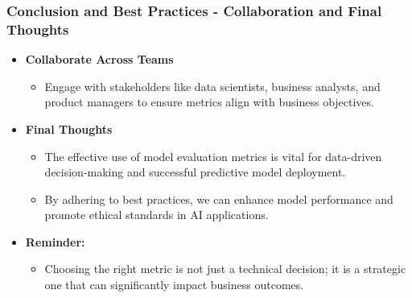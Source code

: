 \documentclass[aspectratio=169]{beamer}
\begin{document}
\begin{frame}[fragile]
  \frametitle{Conclusion and Best Practices - Collaboration and Final Thoughts}
  \begin{itemize}
    \item \textbf{Collaborate Across Teams}
    \begin{itemize}
      \item Engage with stakeholders like data scientists, business analysts, and product managers to ensure metrics align with business objectives.
    \end{itemize}
    
    \item \textbf{Final Thoughts}
    \begin{itemize}
      \item The effective use of model evaluation metrics is vital for data-driven decision-making and successful predictive model deployment.
      \item By adhering to best practices, we can enhance model performance and promote ethical standards in AI applications.
    \end{itemize}
    
    \item \textbf{Reminder:}
    \begin{itemize}
      \item Choosing the right metric is not just a technical decision; it is a strategic one that can significantly impact business outcomes.
    \end{itemize}
  \end{itemize}
\end{frame}
\end{document}
